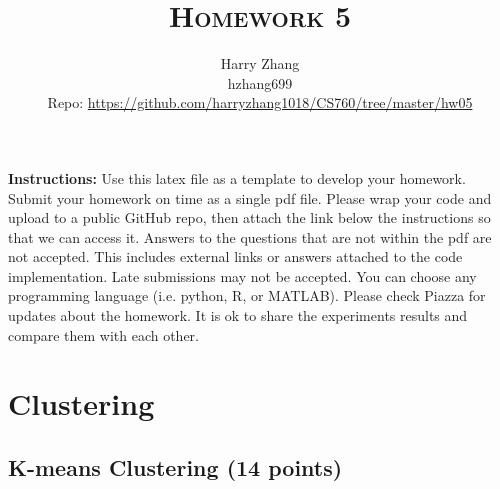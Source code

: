\documentclass[a4paper]{article}
\title{\textsc{Homework 5}} %
\author{
Harry Zhang\\
hzhang699\\
Repo: \url{https://github.com/harryzhang1018/CS760/tree/master/hw05}
}
\date{}
\theoremstyle{definition}
\begin{document}
\maketitle 


\textbf{Instructions:}
Use this latex file as a template to develop your homework. Submit your homework on time as a single pdf file. Please wrap your code and upload to a public GitHub repo, then attach the link below the instructions so that we can access it. Answers to the questions that are not within the pdf are not accepted. This includes external links or answers attached to the code implementation. Late submissions may not be accepted. You can choose any programming language (i.e. python, R, or MATLAB). Please check Piazza for updates about the homework. It is ok to share the experiments results and compare them with each other.

\vspace{0.1in}


\section{Clustering}

\subsection{K-means Clustering (14 points)}
\end{document}
